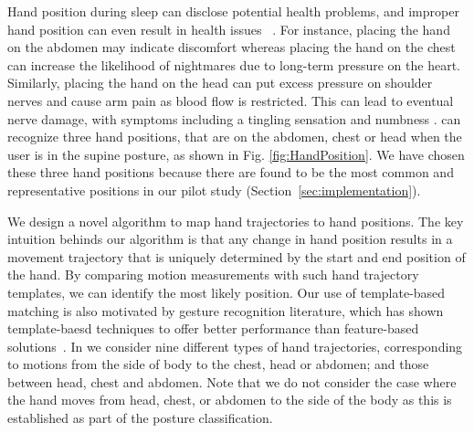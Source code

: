 Hand position during sleep can disclose potential health problems, and improper hand position can even result in health issues~
\cite{position2014}. For instance, placing the hand on the abdomen may indicate discomfort whereas placing the hand on the chest can
increase the likelihood of nightmares due to long-term pressure on the heart. Similarly, placing the hand on the head can put excess
pressure on shoulder nerves and cause arm pain as blood flow is restricted. This can lead to eventual nerve damage, with symptoms including
a tingling sensation and numbness \cite{position2014}. {\systemname} can recognize three hand positions, that are on the abdomen, chest or
head when the user is in the supine posture, as shown in Fig. \ref{fig:HandPosition}. We have chosen these three hand positions because
there are found to be the most common and representative positions in our pilot study (Section~\ref{sec:implementation}).



We design a novel algorithm to map hand trajectories to  hand positions. The key intuition behinds our algorithm is that any change in hand
position results in a movement trajectory that is uniquely determined by the start and end position of the hand. By comparing motion
measurements with such hand trajectory templates, we can identify the most likely position. Our use of template-based matching is also
motivated by gesture recognition literature, which has shown template-baesd techniques to offer better performance than feature-based
solutions~\cite{ahmed15checksum}. In \systemname we consider nine different types of hand trajectories, corresponding to motions from the
side of body to the chest, head or abdomen; and those between head, chest and abdomen. Note that we do not consider the case where the hand
moves from head, chest, or abdomen to the side of the body as this is established as part of the posture classification.

